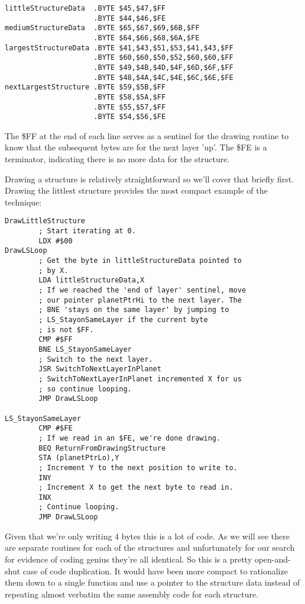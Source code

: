 \begin{lstlisting}[caption=The definitions of three of the structures above\, each of which serves all five planets.]
littleStructureData  .BYTE $45,$47,$FF
                     .BYTE $44,$46,$FE
mediumStructureData  .BYTE $65,$67,$69,$6B,$FF
                     .BYTE $64,$66,$68,$6A,$FE
largestStructureData .BYTE $41,$43,$51,$53,$41,$43,$FF
                     .BYTE $60,$60,$50,$52,$60,$60,$FF
                     .BYTE $49,$4B,$4D,$4F,$6D,$6F,$FF
                     .BYTE $48,$4A,$4C,$4E,$6C,$6E,$FE
nextLargestStructure .BYTE $59,$5B,$FF
                     .BYTE $58,$5A,$FF
                     .BYTE $55,$57,$FF
                     .BYTE $54,$56,$FE
\end{lstlisting}

The \$FF at the end of each line serves as a sentinel for the drawing routine to know that the subsequent bytes
are for the next layer 'up'. The \$FE is a terminator, indicating there is no more data for the structure.

Drawing a structure is relatively straightforward so we'll cover that briefly first. Drawing the littlest
structure provides the most compact example of the technique:

\begin{lstlisting}[caption=The littlest structure has only two layers.]
DrawLittleStructure
        ; Start iterating at 0.
        LDX #$00
DrawLSLoop
        ; Get the byte in littleStructureData pointed to
        ; by X.
        LDA littleStructureData,X
        ; If we reached the 'end of layer' sentinel, move
        ; our pointer planetPtrHi to the next layer. The
        ; BNE 'stays on the same layer' by jumping to
        ; LS_StayonSameLayer if the current byte
        ; is not $FF.
        CMP #$FF
        BNE LS_StayonSameLayer
        ; Switch to the next layer.
        JSR SwitchToNextLayerInPlanet
        ; SwitchToNextLayerInPlanet incremented X for us
        ; so continue looping.
        JMP DrawLSLoop

LS_StayonSameLayer   
        CMP #$FE
        ; If we read in an $FE, we're done drawing.
        BEQ ReturnFromDrawingStructure
        STA (planetPtrLo),Y
        ; Increment Y to the next position to write to.
        INY
        ; Increment X to get the next byte to read in.
        INX
        ; Continue looping.
        JMP DrawLSLoop
\end{lstlisting}

Given that we're only writing 4 bytes this is a lot of code. As we will see there are separate routines for each
of the structures and unfortunately for our search for evidence of coding genius they're all identical. So this
is a pretty open-and-shut case of code duplication. It would have been more compact to rationalize them down to a single function
and use a pointer to the structure data instead of repeating almost verbatim the same assembly code for each
structure. 

